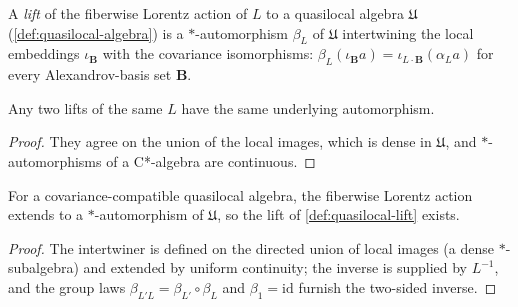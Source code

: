\begin{definition}
    \label{def:quasilocal-lift}
    \leanok
    A \emph{lift} of the fiberwise Lorentz action of $L$ to a quasilocal algebra $\mathfrak{U}$ (\ref{def:quasilocal-algebra}) is a $*$-automorphism $\beta_L$ of $\mathfrak{U}$ intertwining the local embeddings $\iota_{\mathbf{B}}$ with the covariance isomorphisms: $\beta_L(\iota_{\mathbf{B}} a) = \iota_{L\cdot\mathbf{B}}(\alpha_L a)$ for every Alexandrov-basis set $\mathbf{B}$.
\end{definition}

\begin{lemma}
    \label{lmm:quasilocal-lift-unique}
    \leanok
    Any two lifts of the same $L$ have the same underlying automorphism.
\end{lemma}
\begin{proof}
    \leanok
    They agree on the union of the local images, which is dense in $\mathfrak{U}$, and $*$-automorphisms of a C*-algebra are continuous.
\end{proof}

\begin{theorem}
    \label{thrm:quasilocal-lift-exists}
    \leanok
    For a covariance-compatible quasilocal algebra, the fiberwise Lorentz action extends to a $*$-automorphism of $\mathfrak{U}$, so the lift of \ref{def:quasilocal-lift} exists.
\end{theorem}
\begin{proof}
    \leanok
    The intertwiner is defined on the directed union of local images (a dense $*$-subalgebra) and extended by uniform continuity; the inverse is supplied by $L^{-1}$, and the group laws $\beta_{L'L} = \beta_{L'}\circ\beta_L$ and $\beta_{1} = \mathrm{id}$ furnish the two-sided inverse.
\end{proof}


